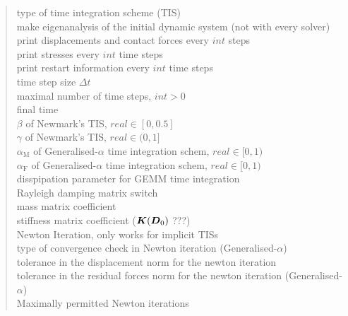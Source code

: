 \begin{quote}
 \chs type
of time integration scheme (TIS) \\
 \chs make eigenanalysis of the initial dynamic
system (not with every solver) \\
 \chs print displacements and contact forces every $int$
steps \\
 \chs print stresses every $int$ time steps \\
 \chs print restart information every $int$ time steps
\\
 \chs time step size $\Delta t$ \\
 \chs maximal number of time steps, $int>0$ \\
 \chs final time \\
 \chs $\beta$ of Newmark's TIS,
$real\in[0,0.5]$ \\
 \chs $\gamma$ of Newmark's TIS,
$real\in(0,1]$ \\
 \chs $\alpha_\text{M}$ of Generalised-$\alpha$ time
integration schem, $real\in[0,1)$ \\
 \chs $\alpha_\text{F}$ of Generalised-$\alpha$ time
integration schem, $real\in[0,1)$ \\
 \chs disspipation parameter for GEMM time integration \\
  Rayleigh damping matrix switch \\
 \chs mass matrix coefficient \\
 \chs stiffness matrix coefficient ($\boldsymbol{K}(\boldsymbol{D}_0)$
???)\\
 \chs Newton Iteration, only
 works for implicit TISs \\
 \chs type of convergence check in Newton iteration (Generalised-$\alpha$)\\
 \chs tolerance in the displacement norm for the newton iteration \\
 \chs tolerance in the residual forces norm for the newton iteration (Generalised-$\alpha$)\\
 \chs Maximally permitted Newton iterations \\

\end{quote}
